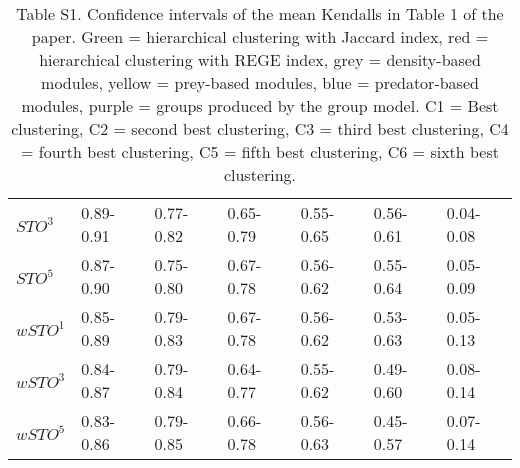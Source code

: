 \begin{table}[ht]
\begin{tabular}{lllllll}
\(\displaystyle STO^3 \) &   {\color[HTML]{00D768} 0.89-0.91} & {\color[HTML]{EF2A00} 0.77-0.82} & {\color[HTML]{0051D7} 0.65-0.79} & {\color{orange} 0.55-0.65} & {\color[HTML]{6200D7} 0.56-0.61} & {\color[HTML]{9B9B9B} 0.04-0.08} \\ 
\(\displaystyle STO^5 \) &   {\color[HTML]{00D768} 0.87-0.90} & {\color[HTML]{EF2A00} 0.75-0.80} & {\color[HTML]{0051D7} 0.67-0.78} & {\color[HTML]{6200D7} 0.56-0.62} & {\color{orange} 0.55-0.64} & {\color[HTML]{9B9B9B} 0.05-0.09} \\ 
\(\displaystyle wSTO^1 \) &   {\color[HTML]{00D768} 0.85-0.89} & {\color[HTML]{EF2A00} 0.79-0.83} & {\color[HTML]{0051D7} 0.67-0.78} & {\color[HTML]{6200D7} 0.56-0.62} & {\color{orange} 0.53-0.63} & {\color[HTML]{9B9B9B} 0.05-0.13} \\ 
\(\displaystyle wSTO^3 \) &   {\color[HTML]{00D768} 0.84-0.87} & {\color[HTML]{EF2A00} 0.79-0.84} & {\color[HTML]{0051D7} 0.64-0.77} & {\color[HTML]{6200D7} 0.55-0.62} & {\color{orange} 0.49-0.60} & {\color[HTML]{9B9B9B} 0.08-0.14} \\ 
\(\displaystyle wSTO^5 \) &   {\color[HTML]{00D768} 0.83-0.86} & {\color[HTML]{EF2A00} 0.79-0.85} & {\color[HTML]{0051D7} 0.66-0.78} & {\color[HTML]{6200D7} 0.56-0.63} & {\color{orange} 0.45-0.57} & {\color[HTML]{9B9B9B} 0.07-0.14} \\ 
\end{tabular}
\caption{Table S1. Confidence intervals of the mean Kendalls in Table 1 of the paper. {\color[HTML]{00D768} Green = hierarchical clustering with Jaccard index}, {\color[HTML]{EF2A00} red = hierarchical clustering with REGE index}, {\color[HTML]{9B9B9B} grey = density-based modules}, {\color{orange} yellow = prey-based modules}, {\color[HTML]{0051D7} blue = predator-based modules}, {\color[HTML]{6200D7} purple = groups produced by the group model}. C1 = Best clustering, C2 = second best clustering, C3 = third best clustering, C4 = fourth best clustering, C5 = fifth best clustering, C6 = sixth best clustering.}
\end{table}
